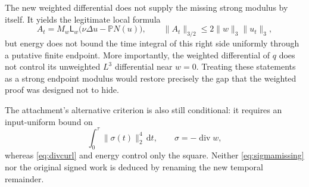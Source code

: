 \documentclass[11pt,a4paper]{article}
\theoremstyle{definition}\newtheorem{definition}[theorem]{Definition}
\theoremstyle{remark}\newtheorem{remark}[theorem]{Remark}
\newcommand{\PP}{\mathbb P}
\newcommand{\LP}{\mathsf L}
\newcommand{\dd}{\,\mathrm d}
\newcommand{\norm}[1]{\lVert #1\rVert}
\newcommand{\diver}{\operatorname{div}}
\numberwithin{equation}{section}
\begin{document}
The new weighted differential does not supply the missing strong modulus by itself. It yields the legitimate local formula
\[
 A_t=M_w\LP_w\bigl(\nu\Delta u-\PP N(u)\bigr),
 \qquad \norm{A_t}_{3/2}\le2\norm w_3\norm{u_t}_3,
\]
but energy does not bound the time integral of this right side uniformly through a putative finite endpoint. More importantly, the weighted differential of $q$ does not control its unweighted $L^3$ differential near $w=0$. Treating these statements as a strong endpoint modulus would restore precisely the gap that the weighted proof was designed not to hide.

The attachment's alternative criterion is also still conditional: it requires an input-uniform bound on
\begin{equation}\label{eq:sigmamissing}
 \int_0^\tau\norm{\sigma(t)}_2^4\dd t,
 \qquad \sigma=-\diver w,
\end{equation}
whereas \eqref{eq:divcurl} and energy control only the square. Neither \eqref{eq:sigmamissing} nor the original signed work is deduced by renaming the new temporal remainder.
\end{document}
